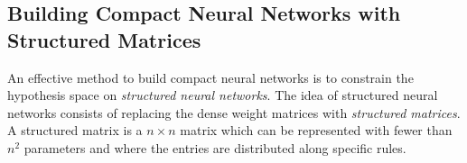 \subsection{Building Compact Neural Networks with Structured Matrices}
\label{subsection:ch3-building_compact_neural_networks_with_structured_matrices}









An effective method to build compact neural networks is to constrain the hypothesis space on \emph{structured neural networks}. 
The idea of structured neural networks consists of replacing the dense weight matrices with \emph{structured matrices}.
A structured matrix is a $n \times n$ matrix which can be represented with fewer than $n^2$ parameters and where the entries are distributed along specific rules.



